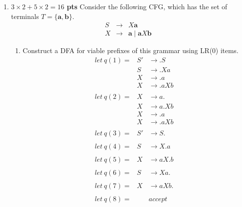 \documentclass[10pt]{article}
\newcommand {\pts}[1]{{\bf #1 pts}}
\begin{document}
\begin{enumerate}
\newpage
\item \pts{$3\times 2+5\times 2 =16$} Consider the following CFG, which has the set of terminals
$T = \{ \textbf{a}, \textbf{b} \}$.
\[\begin{array}{cll}
 S & \rightarrow & X \textbf{a} \\
X & \rightarrow & \textbf{a} \mid \textbf{a} X \textbf{b} 
\end{array}\]
 
\begin{enumerate}

\item Construct a DFA for viable prefixes of this grammar using LR(0)
items.
          \[\begin{array}{cll}
              let \ q(1) = & S' & \rightarrow .S \\
                           & S & \rightarrow .Xa \\
                           & X & \rightarrow .a \\
                           & X & \rightarrow .aXb \\
                           \\
              let \ q(2) = & X & \rightarrow a. \\
                           & X & \rightarrow a.Xb \\
                           & X & \rightarrow .a \\
                           & X & \rightarrow .aXb \\
                           \\
              let \ q(3) = & S' & \rightarrow S. \\
                           \\
              let \ q(4) = & S & \rightarrow X.a \\
                           \\
              let \ q(5) = & X & \rightarrow aX.b \\
                           \\
              let \ q(6) = & S & \rightarrow Xa. \\
                           \\
              let \ q(7) = & X & \rightarrow aXb. \\
                           \\
              let \ q(8) = & &accept \\
           \end{array}\] 

\end{enumerate}
\end{enumerate}
\end{document}
